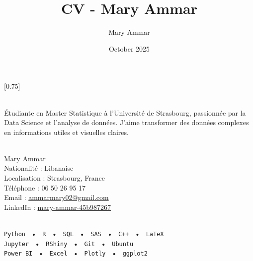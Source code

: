 \documentclass[lighthipster]{simplehipstercv}
\title{CV - Mary Ammar}
\author{Mary Ammar}
\date{October 2025}
\begin{document}
\thispagestyle{empty}


\subsection*{}
\vspace{4em}

\setlength{\columnsep}{1.5cm}
[0.75]
\begin{paracol}{2}
\paracolbackgroundoptions

\footnotesize
{\setasidefontcolour
\flushright
\begin{center}
\end{center}

\\[0.5em]
{\footnotesize
Étudiante en Master Statistique à l’Université de Strasbourg, passionnée par la Data Science et l’analyse de données. J’aime transformer des données complexes en informations utiles et visuelles claires.}
\bigskip

 \\[0.5em]
Mary Ammar \\
Nationalité : Libanaise \\
Localisation : Strasbourg, France \\
Téléphone : 06 50 26 95 17 \\
Email : \href{mailto:ammarmary02@gmail.com}{ammarmary02@gmail.com} \\
LinkedIn : \href{https://www.linkedin.com/in/mary-ammar-45b987267}{mary-ammar-45b987267}

\bigskip

\\[0.5em]
\texttt{Python} ~•~ \texttt{R} ~•~ \texttt{SQL} ~•~ \texttt{SAS} ~•~ \texttt{C++} ~•~ \texttt{LaTeX} \\
\vspace{0.5em}
\texttt{Jupyter} ~•~ \texttt{RShiny} ~•~ \texttt{Git} ~•~ \texttt{Ubuntu} \\
\texttt{Power BI} ~•~ \texttt{Excel} ~•~ \texttt{Plotly} ~•~ \texttt{ggplot2}

}
\end{paracol}
\end{document}
